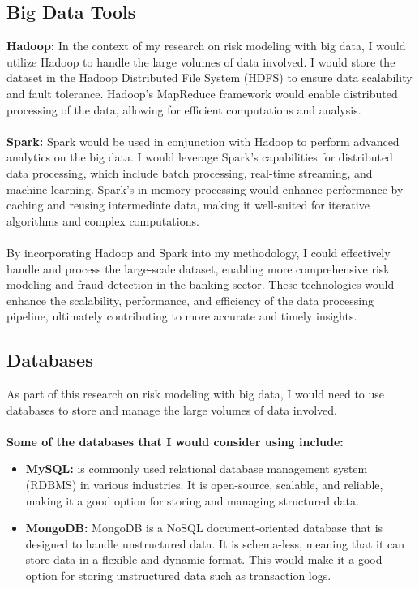 \subsection{Big Data Tools}
\textbf{Hadoop:} In the context of my research on risk modeling with big data, I would utilize Hadoop to handle the 
large volumes of data involved. I would store the dataset in the Hadoop Distributed File System (HDFS) to ensure 
data scalability and fault tolerance. Hadoop's MapReduce framework would enable distributed processing of the data, 
allowing for efficient computations and analysis.\\\\
\textbf{Spark:} Spark would be used in conjunction with Hadoop to perform advanced analytics on the big data. I 
would leverage Spark's capabilities for distributed data processing, which include batch processing, real-time 
streaming, and machine learning. Spark's in-memory processing would enhance performance by caching and reusing 
intermediate data, making it well-suited for iterative algorithms and complex computations.\\\\
By incorporating Hadoop and Spark into my methodology, I could effectively handle and process the large-scale 
dataset, enabling more comprehensive risk modeling and fraud detection in the banking sector. These technologies 
would enhance the scalability, performance, and efficiency of the data processing pipeline, ultimately contributing 
to more accurate and timely insights.

\subsection{Databases}
As part of this research on risk modeling with big data, I would need to use databases to store and manage the 
large volumes of data involved.\\\\
\textbf{Some of the databases that I would consider using include:}
\begin{itemize}
    \item \textbf{MySQL:} is commonly used relational database management system (RDBMS) in various industries.
    It is open-source, scalable, and reliable, making it a good option for storing and managing structured data.
    \item \textbf{MongoDB:} MongoDB is a NoSQL document-oriented database that is designed to handle unstructured data. It is 
    schema-less, meaning that it can store data in a flexible and dynamic format. This would make it a good option for 
    storing unstructured data such as transaction logs.
\end{itemize}
